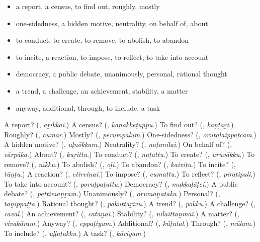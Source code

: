 \begin{itemize}
\raggedright
  \item a report, a census, to find out, roughly, mostly
  \item one-sidedness, a hidden motive, neutrality, on behalf of, about
  \item to conduct, to create, to remove, to abolish, to abandon
  \item to incite, a reaction, to impose, to reflect, to take into account
  \item democracy, a public debate, unanimously, personal, rational thought
  \item a trend, a challenge, an achievement, stability, a matter
  \item anyway, additional, through, to include, a task
\end{itemize}

\begin{tcolorbox}[breakable,colback=teal!4,colframe=teal!35!black,title={Before you move on}]
A report? (\textbf{}, \emph{aṟikkai}.) A census? (\textbf{}, \emph{kaṇakkeṭuppu}.) To find out? (\textbf{}, \emph{kaṇṭaṟi}.) Roughly? (\textbf{}, \emph{cumār}.) Mostly? (\textbf{}, \emph{perumpālum}.) One-sidedness? (\textbf{}, \emph{orutalaippaṭcam}.) A hidden motive? (\textbf{}, \emph{uḷnōkkam}.) Neutrality? (\textbf{}, \emph{naṭunilai}.) On behalf of? (\textbf{}, \emph{cārpāka}.) About? (\textbf{}, \emph{kuṟittu}.) To conduct? (\textbf{}, \emph{naṭattu}.) To create? (\textbf{}, \emph{uruvākku}.) To remove? (\textbf{}, \emph{nīkku}.) To abolish? (\textbf{}, \emph{oḻi}.) To abandon? (\textbf{}, \emph{kaiviṭu}.) To incite? (\textbf{}, \emph{tūṇṭu}.) A reaction? (\textbf{}, \emph{etirviṉai}.) To impose? (\textbf{}, \emph{cumattu}.) To reflect? (\textbf{}, \emph{piratipali}.) To take into account? (\textbf{}, \emph{poruṭpaṭuttu}.) Democracy? (\textbf{}, \emph{makkaḷāṭci}.) A public debate? (\textbf{}, \emph{paṭṭimaṉṟam}.) Unanimously? (\textbf{}, \emph{orumaṉatāka}.) Personal? (\textbf{}, \emph{taṉippaṭṭa}.) Rational thought? (\textbf{}, \emph{pakuttaṟivu}.) A trend? (\textbf{}, \emph{pōkku}.) A challenge? (\textbf{}, \emph{cavāl}.) An achievement? (\textbf{}, \emph{cātaṉai}.) Stability? (\textbf{}, \emph{nilaittaṉmai}.) A matter? (\textbf{}, \emph{vivakāram}.) Anyway? (\textbf{}, \emph{eppaṭiyum}.) Additional? (\textbf{}, \emph{kūṭutal}.) Through? (\textbf{}, \emph{mūlam}.) To include? (\textbf{}, \emph{uḷḷaṭakku}.) A task? (\textbf{}, \emph{kāriyam}.)
\end{tcolorbox}
